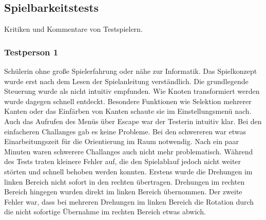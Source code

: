 %



\newpage



\label{Abschnitt:Tests:Protokoll:Abnahme}



\subsection*{Spielbarkeitstests}

Kritiken und Kommentare von Testspielern.\\



\subsubsection*{Testperson 1}

Schülerin ohne große Spielerfahrung oder nähe zur Informatik. Das Spielkonzept wurde erst nach dem Lesen der Spielanleitung verständlich. Die grundlegende Steuerung wurde als nicht intuitiv empfunden. Wie Knoten transformiert werden wurde dagegen schnell entdeckt. Besondere Funktionen wie Selektion mehrerer Kanten oder das Einfärben von Kanten schaute sie im Einstellungsmenü nach. Auch das Aufrufen des Menüs über Escape war der Testerin intuitiv klar. Bei den einfacheren Challanges gab es keine Probleme. Bei den schwereren war etwas Einarbeitungszeit für die Orientierung im Raum notwendig. Nach ein paar Minuten waren schwerere Challanges auch nicht mehr problematisch. Während des Tests traten kleinere Fehler auf, die den Spielablauf jedoch nicht weiter störten und schnell behoben werden konnten. Erstens wurde die Drehungen im linken Bereich nicht sofort in den rechten übertragen. Drehungen im rechten Bereich hingegen wurden direkt im linken Bereich übernommen. Der zweite Fehler war, dass bei mehreren Drehungen im linken Bereich die Rotation durch die nicht sofortige Übernahme im rechten Bereich etwas abwich.







